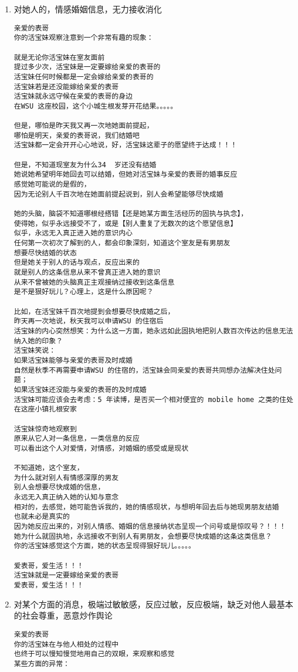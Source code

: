 \documentclass[9pt, b5paper]{article}
\begin{document}
\begin{enumerate}
\item 对她人的，情感婚姻信息，无力接收消化
\label{sec-3-2-4-1}
\begin{verbatim}
亲爱的表哥
你的活宝妹观察注意到一个非常有趣的现象：

就是无论你活宝妹在室友面前
提过多少次，活宝妹是一定要嫁给亲爱的表哥的
活宝妹任何时候都是一定会嫁给亲爱的表哥的
活宝妹若是还没能嫁给亲爱的表哥
活宝妹就永远守候在亲爱的表哥的身边
在WSU 这座校园，这个小城生根发芽开花结果。。。。。

但是，哪怕是昨天我又再一次地她面前提起，
哪怕是明天，亲爱的表哥说，我们结婚吧
活宝妹都一定会开开心心地说，好，活宝妹这辈子的愿望终于达成！！！

但是，不知道现室友为什么34  岁还没有结婚
她说她希望明年她回去可以结婚，但她对活宝妹与亲爱的表哥的婚事反应
感觉她可能说的是假的，
因为无论别人千百次地在她面前提起说到，别人会希望能够尽快成婚

她的头脑，脑袋不知道哪根经搭错【还是她某方面生活经历的固执与执念】，
使得她，似乎永远接受不了，或是【别人重复了无数次的这个愿望信息】
似乎，永远无入真正进入她的意识内心
任何第一次初次了解到的人，都会印象深刻，知道这个室友是有男朋友
想要尽快结婚的状态
但是她关于别人的话与观点，反应出来的
就是别人的这条信息从来不曾真正进入她的意识
从来不曾被她的头脑真正主观接纳过接收到这条信息
是不是狠好玩儿？心理上，这是什么原因呢？

比如，在活宝妹千百次地提到会想要尽快成婚之后，
昨天再一次地说，秋天我可以申请WSU 的住宿后
活宝妹的内心突然想笑：为什么这一方面，她永远如此固执地把别人数百次传达的信息无法纳入她的印象？
活宝妹笑说：
如果活宝妹能够与亲爱的表哥及时成婚
自然是秋季不再需要申请WSU 的住宿的，活宝妹会同亲爱的表哥共同想办法解决住处问题；
如果活宝妹还没能与亲爱的表哥的及时成婚
活宝妹可能应该会去考虑：5 年读博，是否买一个相对便宜的 mobile home 之类的住处
在这座小镇扎根安家

活宝妹惊奇地观察到
原来从它人对一条信息，一类信息的反应
可以看出这个人对爱情，对情感，对婚姻的感受或是现状

不知道她，这个室友，
为什么就对别人有情感深厚的男友
别人会想要尽快成婚的信息，
永远无入真正纳入她的认知与意念
相对的，去感觉，她可能告诉我的，她的情感现状，与想明年回去后与她现男朋友结婚
也就未必是真实的
因为她反应出来的，对别人情感、婚姻的信息接纳状态呈现一个问号或是惊叹号？！！！
她为什么就固执地，永远接收不到别人有男朋友，会想要尽快成婚的这条这类信息？
你的活宝妹感觉这个方面，她的状态呈现得狠好玩儿。。。。。

爱表哥，爱生活！！！
活宝妹就是一定要嫁给亲爱的表哥
爱表哥，爱生活！！！
\end{verbatim}
\item 对某个方面的消息，极端过敏敏感，反应过敏，反应极端，缺乏对他人最基本的社会尊重，恶意炒作舆论
\label{sec-3-2-4-2}
\begin{verbatim}
亲爱的表哥
你的活宝妹在与他人相处的过程中
也终于可以慢知慢觉地用自己的双眼，来观察和感觉
某些方面的异常：


\end{verbatim}
\end{enumerate}
\end{document}
